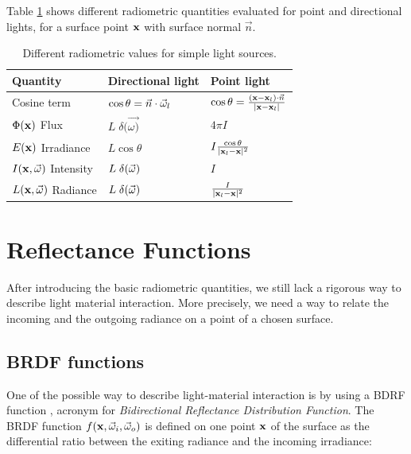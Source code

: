 Table \ref{table:radio} shows different radiometric quantities evaluated for point and directional lights, for a surface point $\mathbf{x}$ with surface normal $\vec{n}$. 

\renewcommand{\arraystretch}{1.8}
\begin{table}[!ht]
    \centering
    \begin{tabularx}{0.95\textwidth}{|X|X|X|}
    \hline
    Quantity   & Directional light & Point light \\ \hline
    Cosine term       & $\cos\theta = \vec{n} \cdot \vec{\omega}_l$ & $\cos\theta = \frac{(\mathbf{x} - \mathbf{x}_l) \cdot \vec{n}}{|\mathbf{x} - \mathbf{x}_l|}$     \\ \hline
    $\Phi(\mathbf{x})$ Flux       & $L\; \delta(\vec{\omega)}$                  & $4 \pi I$           \\ \hline
    $E(\mathbf{x})$ Irradiance & $L \cos\theta $                 & $I \frac{\cos\theta}{|\mathbf{x}_l - \mathbf{x}|^2}$          \\ \hline
    $I(\mathbf{x},\vec{\omega})$ Intensity  & $L\; \delta(\vec{\omega})$                 & $I$           \\ \hline
    $L(\mathbf{x},\vec{\omega})$ Radiance   & $L\; \delta(\vec{\omega})$               & $\frac{I}{|\mathbf{x}_l - \mathbf{x}|^2}$           \\ \hline
    \end{tabularx}
\caption{Different radiometric values for simple light sources.}
\label{table:radio}
\end{table}

\section{Reflectance Functions}
 
After introducing the basic radiometric quantities, we still lack a rigorous way to describe light material interaction. More precisely, we need a way to relate the incoming and the outgoing radiance on a point of a chosen surface. 

\subsection{BRDF functions}
\label{sec:brdf}
One of the possible way to describe light-material interaction is by using a BDRF function \citep{Nicodemus:1992:GCN:136913.136929}, acronym for \emph{Bidirectional Reflectance Distribution Function}. The BRDF function $f(\mathbf{x}, \vec{\omega}_i, \vec{\omega}_o)$ is defined on one point $\mathbf{x}$ of the surface as the differential ratio between the exiting radiance and the incoming irradiance:

